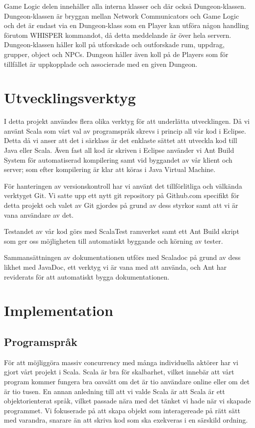 \documentclass[a4paper]{article}
\begin{document}
Game Logic delen innehåller alla interna klasser och där också Dungeon-klassen. Dungeon-klassen är bryggan mellan Network 
Communicators och Game Logic och det är endast via en Dungeon-klass som en Player kan utföra någon handling förutom WHISPER kommandot, 
då detta meddelande är över hela servern. Dungeon-klassen håller koll på utforskade och outforskade rum, uppdrag, grupper, object och NPCs. 
Dungeon håller även koll på de Players som för tillfället är uppkopplade och associerade med en given Dungeon.

\section{Utvecklingsverktyg}

I detta projekt användes flera olika verktyg för att underlätta utvecklingen. Då vi använt Scala som vårt val av programspråk skrevs i princip all vår kod i Eclipse. 
Detta då vi anser att det i särklass är det enklaste sättet att utveckla kod till Java eller Scala. Även fast all kod är skriven i Eclipse använder vi Ant Build System 
för automatiserad kompilering samt vid byggandet av vår klient och server; som efter kompilering är klar att köras i Java Virtual Machine. 

För hanteringen av versionskontroll har vi använt det tillförlitliga och välkända verktyget Git. Vi satte upp ett nytt git repository på Github.com specifikt för detta 
projekt och valet av Git gjordes på grund av dess styrkor samt att vi är vana användare av det.

Testandet av vår kod görs med ScalaTest ramverket samt ett Ant Build skript som ger oss möjligheten till automatiskt byggande och körning av tester.

Sammansättningen av dokumentationen utförs med Scaladoc på grund av dess likhet med JavaDoc, ett verktyg vi är vana med att använda, och Ant har reviderats för att automatiskt 
bygga dokumentationen.

\section{Implementation}

\subsection{Programspråk}
För att möjliggöra massiv concurrency med många individuella aktörer har vi gjort vårt projekt i Scala. Scala är bra för skalbarhet, vilket innebär att vårt program kommer fungera bra oavsätt om det är tio användare online eller om det är tio tusen. En annan anledning till att vi valde Scala är att Scala är ett objektorienterat språk, vilket passade nära med det tänket vi hade när vi skapade programmet. Vi fokuserade på att skapa objekt som interagereade på rätt sätt med varandra, snarare än att skriva kod som ska exekveras i en särskild ordning.
\end{document}
